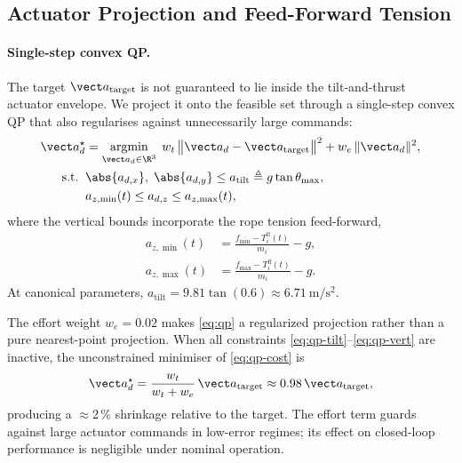 \subsection{Actuator Projection and Feed-Forward Tension}
\label{sec:qp-and-ff}

\paragraph{Single-step convex QP.} The target $\vect a_{\mathrm{target}}$ is not guaranteed to lie inside the tilt-and-thrust actuator envelope. We project it onto the feasible set through a single-step convex QP that also regularises against unnecessarily large commands:
\begin{subequations}
\label{eq:qp}
\begin{align}
  \vect a_d^\star
    &= \operatorname*{argmin}_{\vect a_d \in \R^3}
      \; w_t\,\bigl\|\vect a_d - \vect a_{\mathrm{target}}\bigr\|^2
      + w_e\,\|\vect a_d\|^2,
    \label{eq:qp-cost} \\
  \text{s.t.}\;\;
    &\abs{a_{d,x}},\;\abs{a_{d,y}}
      \le a_{\mathrm{tilt}} \triangleq g\tan\theta_{\max},
    \label{eq:qp-tilt} \\
    &a_{z,\min}(t) \le a_{d,z} \le a_{z,\max}(t),
    \label{eq:qp-vert}
\end{align}
\end{subequations}
where the vertical bounds incorporate the rope tension
feed-forward,
\begin{align}
\label{eq:az-bounds}
  a_{z,\min}(t) &= \frac{f_{\min} - T_i^{\mathrm{ff}}(t)}{m_i} - g,\\
  a_{z,\max}(t) &= \frac{f_{\max} - T_i^{\mathrm{ff}}(t)}{m_i} - g.\nonumber
\end{align}
At canonical parameters,
$a_{\mathrm{tilt}} = 9.81\tan(0.6)
\approx \SI{6.71}{\metre\per\second\squared}$.

\begin{remark}
The effort weight $w_e = 0.02$ makes \eqref{eq:qp} a regularized projection rather than a pure nearest-point projection. When all constraints \eqref{eq:qp-tilt}--\eqref{eq:qp-vert} are inactive, the unconstrained minimiser of \eqref{eq:qp-cost} is
\begin{equation}
\label{eq:qp-unconstrained}
  \vect a_d^\star
    = \frac{w_t}{w_t + w_e}\,\vect a_{\mathrm{target}}
    \approx 0.98\,\vect a_{\mathrm{target}},
\end{equation}
producing a ${\approx}2\,\%$ shrinkage relative to the target. The effort term guards against large actuator commands in low-error regimes; its effect on closed-loop performance is negligible under nominal operation.
\end{remark}

